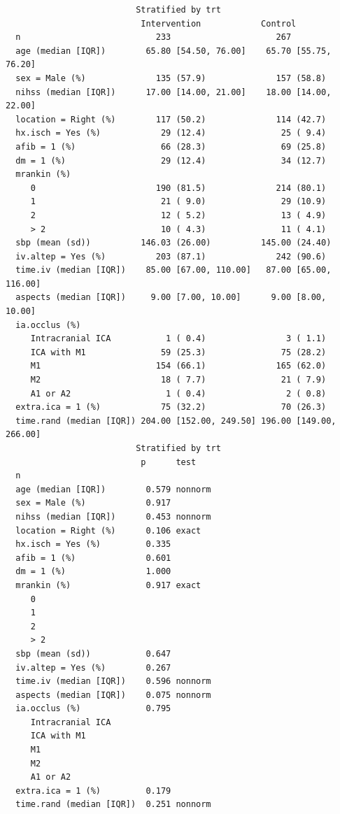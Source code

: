 \documentclass[]{book}
\theoremstyle{definition}
\theoremstyle{definition}
\theoremstyle{definition}
\theoremstyle{remark}
\begin{document}
\begin{verbatim}
                          Stratified by trt
                           Intervention            Control                
  n                           233                     267                 
  age (median [IQR])        65.80 [54.50, 76.00]    65.70 [55.75, 76.20]  
  sex = Male (%)              135 (57.9)              157 (58.8)          
  nihss (median [IQR])      17.00 [14.00, 21.00]    18.00 [14.00, 22.00]  
  location = Right (%)        117 (50.2)              114 (42.7)          
  hx.isch = Yes (%)            29 (12.4)               25 ( 9.4)          
  afib = 1 (%)                 66 (28.3)               69 (25.8)          
  dm = 1 (%)                   29 (12.4)               34 (12.7)          
  mrankin (%)                                                             
     0                        190 (81.5)              214 (80.1)          
     1                         21 ( 9.0)               29 (10.9)          
     2                         12 ( 5.2)               13 ( 4.9)          
     > 2                       10 ( 4.3)               11 ( 4.1)          
  sbp (mean (sd))          146.03 (26.00)          145.00 (24.40)         
  iv.altep = Yes (%)          203 (87.1)              242 (90.6)          
  time.iv (median [IQR])    85.00 [67.00, 110.00]   87.00 [65.00, 116.00] 
  aspects (median [IQR])     9.00 [7.00, 10.00]      9.00 [8.00, 10.00]   
  ia.occlus (%)                                                           
     Intracranial ICA           1 ( 0.4)                3 ( 1.1)          
     ICA with M1               59 (25.3)               75 (28.2)          
     M1                       154 (66.1)              165 (62.0)          
     M2                        18 ( 7.7)               21 ( 7.9)          
     A1 or A2                   1 ( 0.4)                2 ( 0.8)          
  extra.ica = 1 (%)            75 (32.2)               70 (26.3)          
  time.rand (median [IQR]) 204.00 [152.00, 249.50] 196.00 [149.00, 266.00]
                          Stratified by trt
                           p      test   
  n                                      
  age (median [IQR])        0.579 nonnorm
  sex = Male (%)            0.917        
  nihss (median [IQR])      0.453 nonnorm
  location = Right (%)      0.106 exact  
  hx.isch = Yes (%)         0.335        
  afib = 1 (%)              0.601        
  dm = 1 (%)                1.000        
  mrankin (%)               0.917 exact  
     0                                   
     1                                   
     2                                   
     > 2                                 
  sbp (mean (sd))           0.647        
  iv.altep = Yes (%)        0.267        
  time.iv (median [IQR])    0.596 nonnorm
  aspects (median [IQR])    0.075 nonnorm
  ia.occlus (%)             0.795        
     Intracranial ICA                    
     ICA with M1                         
     M1                                  
     M2                                  
     A1 or A2                            
  extra.ica = 1 (%)         0.179        
  time.rand (median [IQR])  0.251 nonnorm
\end{verbatim}
\end{document}
